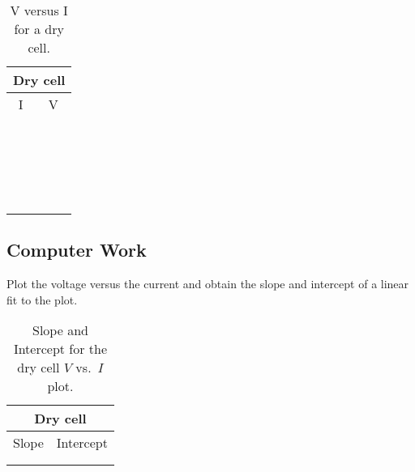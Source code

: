 \begin{table}[htb]
\begin{center}
\begin{tabular}{|c|c|}
\hline
\multicolumn{2}{|c|}{Dry cell}\\
\hline
I & V \\
\hline
\hspace*{5cm} & \hspace*{5cm} \\
& \\
\hline
& \\
& \\
\hline
& \\
& \\
\hline
& \\
& \\
\hline
& \\
& \\
\hline
& \\
& \\
\hline
& \\
& \\
\hline
& \\
& \\
\hline
& \\
& \\
\hline
& \\
& \\
\hline
\end{tabular}
\end{center}
\caption{V versus I for a dry cell.}
\label{tab:DC:DryCell}
\end{table}
\clearpage

\subsection{Computer Work}
Plot the voltage versus the current and obtain the slope and intercept of a
linear fit to the plot. 
\begin{table}[htb]
\begin{center}
\begin{tabular}{|c|c|}
\hline
\multicolumn{2}{|c|}{Dry cell} \\
\hline
Slope & Intercept \\
\hline
\hspace*{5cm} & \hspace*{5cm} \\
& \\
\hline
\end{tabular}
\end{center}
\caption{Slope and Intercept for the dry cell $V$ vs.\ $I$ plot.}
\end{table}

